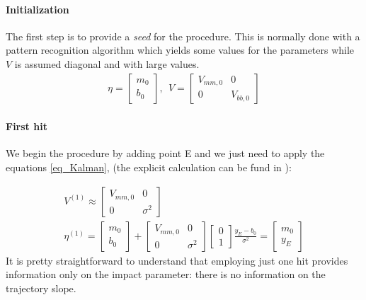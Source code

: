\documentclass[12pt,a4paper,openright, oneside, titlepage]{book} %
\begin{document}
\paragraph{Initialization} 
The first step is to provide a \textit{seed} for the procedure. 
This is normally done with a pattern recognition algorithm 
which yields some values for the parameters while $V$ is assumed diagonal and with large values.
\begin{align*}
\eta = \begin{bmatrix} m_0 \\  b_0 \end{bmatrix},\ \ V=\begin{bmatrix} V_{mm,0}& 0 \\ 0& V_{bb,0} \end{bmatrix}
\end{align*}

\paragraph{First hit} 
We begin the procedure by adding point E
and we just need to apply the equations \ref{eq_Kalman}, (the explicit calculation can be fund in \cite{Kutschke}):

\begin{gather*}
V^{(1)}\approx \begin{bmatrix}
V_{mm,0} & 0 \\ 0 & \sigma^2
\end{bmatrix}\\
\eta^{(1)} = 
\begin{bmatrix} m_0 \\  b_0 \end{bmatrix} +
\begin{bmatrix} V_{mm,0} & 0 \\ 0 & \sigma^2 \end{bmatrix}
\begin{bmatrix} 0 \\ 1 \end{bmatrix}
\frac{y_E-b_0}{\sigma^2}
= \begin{bmatrix}
m_0 \\ y_E
\end{bmatrix}
\end{gather*}
It is pretty straightforward to understand that employing just one hit provides information 
only on the impact parameter: there is no information on the trajectory slope.
\end{document}
